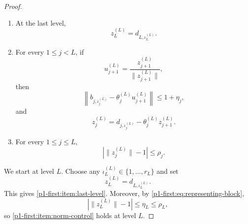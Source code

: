 \documentclass[10pt,a4paper]{amsart}
\begin{document}
\begin{proof}
\begin{enumerate}[label=\textup{(\alph*)}]
\item\label{p1-first:item:last-level} At the last level,
\begin{equation*}
        z_L^{(L)}=d_{L,\iota_L^{(L)}}.
\end{equation*}

\item\label{p1-first:item:backward-recursion} For every $1\leq j<L$, if
\begin{equation*}
        u_{j+1}^{(L)}=\frac{z_{j+1}^{(L)}}{\|z_{j+1}^{(L)}\|},
\end{equation*}
then
\begin{equation}
\label{p1-first:eq:covering-step}
        \left\|b_{j,\iota_j^{(L)}}-\theta_j^{(L)}u_{j+1}^{(L)}\right\|\leq 1+\eta_j,
\end{equation}
and
\begin{equation}
\label{p1-first:eq:z-recursion}
        z_j^{(L)}=d_{j,\iota_j^{(L)}}-\theta_j^{(L)}z_{j+1}^{(L)}.
\end{equation}

\item\label{p1-first:item:norm-control} For every $1\leq j\leq L$,
\begin{equation}
\label{p1-first:eq:z-error-target}
        |\|z_j^{(L)}\|-1|\leq \rho_j.
\end{equation}
\end{enumerate}

We start at level $L$. Choose any $\iota_L^{(L)}\in\{1,\ldots,r_L\}$ and set
\begin{equation*}
        z_L^{(L)}=d_{L,\iota_L^{(L)}}.
\end{equation*}
This gives \ref{p1-first:item:last-level}. Moreover, by \eqref{p1-first:eq:representing-block},
\begin{equation*}
        |\|z_L^{(L)}\|-1|\leq \eta_L\leq \rho_L,
\end{equation*}
so \ref{p1-first:item:norm-control} holds at level $L$.


\end{proof}
\end{document}

